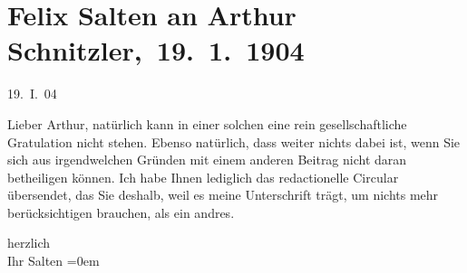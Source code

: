 

\renewcommand{\erwaehnteOrte}{Orte: Wien}
\renewcommand{\erwaehnteWerke}{}
\section[ Felix Salten an Arthur Schnitzler, 19. 1. 1904]{Felix Salten an Arthur Schnitzler, 19. 1. 1904}
\nopagebreak{}
\rehead{ }\normalsize\beginnumbering{}
\toendnotes[C]{\smallbreak\pagebreak[2]}
\toendnotes[C]{\smallbreak}
\pstart
           \raggedleft{}{\pb}19. I. 04\pend
           
\pstart
           Lieber Arthur, natürlich kann in einer solchen \label{K_L03391-1v}\label{K_L03391-1h} eine rein
               gesellschaftliche Gratulation nicht stehen. Ebenso natürlich, dass weiter nichts
               dabei ist, wenn Sie sich aus irgendwelchen Gründen mit einem anderen Beitrag nicht
               daran betheiligen können. Ich habe Ihnen lediglich das redactionelle Circular
               übersendet, das Sie deshalb, weil es meine Unterschrift trägt, um nichts mehr
               berücksichtigen brauchen, als ein andres.\pend
           
\pstart
           herzlich {\\[\baselineskip]}Ihr \spacefill\mbox{Salten}\pend
           \leftskip=0em{}\endnumbering{}  
      